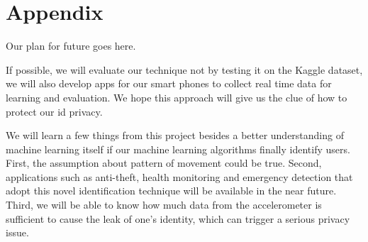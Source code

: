 \documentclass{article} %
\begin{document}
\section*{Appendix}

Our plan for future goes here.

If possible, we will evaluate our technique not by testing it on the Kaggle dataset, we will also develop apps for our smart phones to collect real time data for learning and evaluation. We hope this approach will give us the clue of how to protect our id privacy.

We will learn a few things from this project besides a better understanding of machine learning itself if our machine learning algorithms finally identify users. First, the assumption about pattern of movement could be true. Second, applications such as anti-theft, health monitoring and emergency detection that adopt this novel identification technique will be available in the near future. Third, we will be able to know how much data from the accelerometer is sufficient to cause the leak of one's identity, which can trigger a serious privacy issue.






\end{document}
